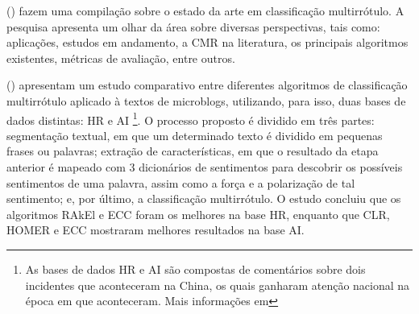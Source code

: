  (\citeyear{gibaja2014}) fazem uma compilação sobre o estado da arte em classificação multirrótulo. A pesquisa apresenta um olhar da área sobre diversas perspectivas, tais como: aplicações, estudos em andamento, a CMR na literatura, os principais algoritmos existentes, métricas de avaliação, entre outros.

 (\citeyear{liu2015multi}) apresentam um estudo comparativo entre diferentes algoritmos de classificação multirrótulo aplicado à textos de microblogs, utilizando, para isso, duas bases de dados distintas: HR e AI
\footnote{As bases de dados HR e AI são compostas de comentários sobre dois incidentes que aconteceram na China, os quais ganharam atenção nacional na época em que aconteceram. Mais informações em }. 
O processo proposto é dividido em três partes: segmentação textual, em que um determinado texto é dividido em pequenas frases ou palavras; extração de características, em que o resultado da etapa anterior é mapeado com 3 dicionários de sentimentos para descobrir os possíveis sentimentos de uma palavra, assim como a força e a polarização de tal sentimento; e, por último, a classificação multirrótulo. O estudo concluiu que os algoritmos RAkEl e ECC foram os melhores na base HR, enquanto que CLR, HOMER e ECC mostraram melhores resultados na base AI.
